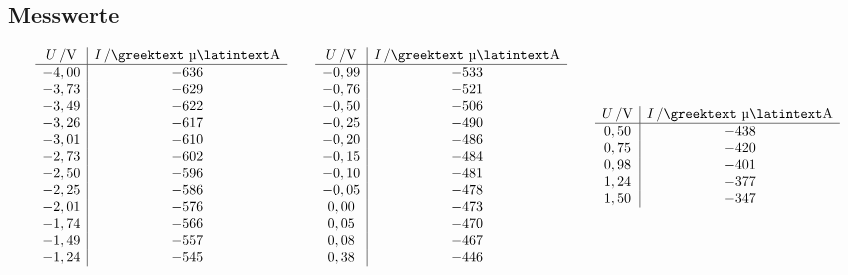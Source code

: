 \documentclass[numbers=noenddot,12pt,a4paper]{scrartcl}
\newcommand{\greek}[1]{\greektext#1\latintext}
\begin{document}
\subsection{Messwerte}
\begin{table}[H]
	\begin{align*}
\begin{array}{c|c}
\unit[U]{/V} & \unit[I]{/\text{\greek{µ}}A}\\\hline
	-4,00 & -636 \\
	-3,73 & -629 \\
	-3,49 & -622 \\
	-3,26 & -617 \\
	-3,01 & -610 \\
	-2,73 & -602 \\
	-2,50 & -596 \\
	-2,25 & -586 \\
	-2,01 & -576 \\
	-1,74 & -566 \\
	-1,49 & -557 \\
	-1,24 & -545 \\
	\end{array}
	\hspace{2em}
	\begin{array}{c|c}
	\unit[U]{/V} & \unit[I]{/\text{\greek{µ}}A}\\\hline
	-0,99 & -533 \\
	-0,76 & -521 \\
	-0,50 & -506 \\
	-0,25 & -490 \\
	-0,20 & -486 \\
	-0,15 & -484 \\
	-0,10 & -481 \\
	-0,05 & -478 \\
	0,00 & -473 \\
	0,05 & -470 \\
	0,08 & -467 \\
	0,38 & -446 \\
	\end{array}
	\hspace{2em}
	\begin{array}{c|c}
	\unit[U]{/V} & \unit[I]{/\text{\greek{µ}}A}\\\hline
	0,50 & -438 \\
	0,75 & -420 \\
	0,98 & -401 \\
	1,24 & -377 \\
	1,50 & -347 \\

\end{array}
\end{align*}
\end{table}
\end{document}

